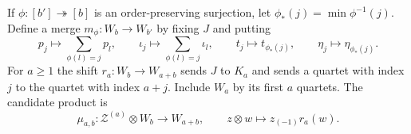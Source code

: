 If $\phi:[b']\twoheadrightarrow[b]$ is an order-preserving
surjection, let $\phi_*(j)=\min\phi^{-1}(j)$. Define a merge
$m_\phi:W_b\to W_{b'}$ by fixing $J$ and putting
\begin{equation}\label{cbc:rc:tower-merge}
 p_j\longmapsto\sum_{\phi(l)=j}p_l,\qquad
 \iota_j\longmapsto\sum_{\phi(l)=j}\iota_l,\qquad
 t_j\longmapsto t_{\phi_*(j)},\qquad
 \eta_j\longmapsto\eta_{\phi_*(j)}.
\end{equation}
For $a\geq1$ the shift $r_a:W_b\to W_{a+b}$ sends $J$ to $K_a$
and sends a quartet with index $j$ to the quartet with index $a+j$.
Include $W_a$ by its first $a$ quartets. The candidate product is
\begin{equation}\label{cbc:rc:tower-product}
 \mu_{a,b}:\mathcal Z^{(a)}\otimes W_b\longrightarrow W_{a+b},
 \qquad z\otimes w\longmapsto z_{(-1)}r_a(w).
\end{equation}

